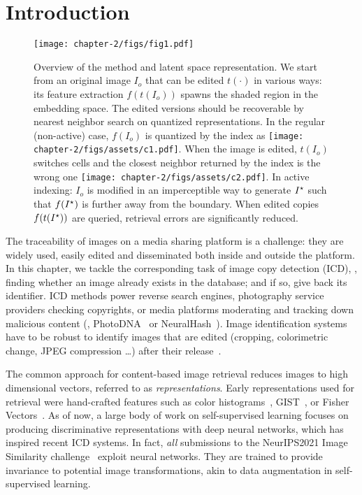 \section{Introduction}\label{chap2/sec:intro}

\begin{figure}[t]
    \centering
    \texttt{[image: chapter-2/figs/fig1.pdf]}
    \caption{ 
    Overview of the method and 
        latent space representation. 
        We start from an original image $I_o$ that can be edited $t(\cdot)$ in various ways: its feature extraction $f(t(I_o))$ spawns the shaded region in the embedding space.
        The edited versions should be recoverable by nearest neighbor search on quantized representations.
        In the regular (non-active) case, $f(I_o)$ is quantized by the index as \texttt{[image: chapter-2/figs/assets/c1.pdf]}. 
        When the image is edited, $t(I_o)$ switches cells and the closest neighbor returned by the index is the wrong one \texttt{[image: chapter-2/figs/assets/c2.pdf]}.
        In active indexing: $I_o$ is modified in an imperceptible way to generate $I^\star$ such that $f(I^\star)$ is further away from the boundary. 
        When edited copies $f(t(I^\star))$ are queried, retrieval errors are significantly reduced.
    \label{chap2/fig:fig1}}
\end{figure}

The traceability of images on a media sharing platform is a challenge: 
they are widely used, easily edited and disseminated both inside and outside the platform.
In this chapter, we tackle the corresponding task of image \gls*{copy detection} (ICD), \ie, finding whether an image already exists in the database; and if so, give back its identifier.
ICD methods power reverse search engines, photography service providers checking copyrights, or media platforms moderating and tracking down malicious content (\eg, PhotoDNA~\citep{photodna} or NeuralHash~\citep{apple2021csamdetection}).
Image identification systems have to be robust to identify images that are edited (cropping, colorimetric change, JPEG compression \ldots) after their release~\citep{douze2021disc, wang2022benchmark}. 

The common approach for content-based image retrieval reduces images to high dimensional vectors, referred to as \emph{representations}. 
Early representations used for retrieval were hand-crafted features such as color histograms~\citep{swain1991color}, GIST~\citep{oliva2001modeling}, or Fisher Vectors~\citep{perronnin2010large}.
As of now, a large body of work on self-supervised learning focuses on producing discriminative representations with deep neural networks, which has inspired recent ICD systems. 
In fact, \emph{all} submissions to the NeurIPS2021 Image Similarity challenge~\citep{papakipos2022results} exploit neural networks.
They are trained to provide invariance to potential image transformations, akin to data augmentation in self-supervised learning.  

